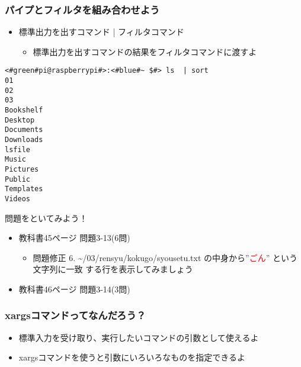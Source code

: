 \begin{frame}[fragile]
    \frametitle{パイプとフィルタを組み合わせよう}
    \begin{itemize}
        \item 標準出力を出すコマンド | フィルタコマンド
        \begin{itemize}
            \small
            \item[] 標準出力を出すコマンドの結果をフィルタコマンドに渡すよ
        \end{itemize}
    \end{itemize}
    \begin{lstlisting}[title=パイプラインを用いたsortコマンドの実行例, label=ppsort_example]
<#green#pi@raspberrypi#>:<#blue#~ $#> ls  | sort
01
02
03
Bookshelf
Desktop
Documents
Downloads
lsfile
Music
Pictures
Public
Templates
Videos
    \end{lstlisting}
\end{frame}

\begin{frame}
    \begin{exampleblock}{問題をといてみよう！}
        \begin{itemize}
            \item 教科書45ページ 問題3-13(6問)
            \begin{itemize}
                \item 問題修正 6. \textasciitilde/03/rensyu/kokugo/syousetu.txt の中身から”\textcolor{red}{ごん}” という文字列に一致
                する行を表示してみましょう
            \end{itemize}
            \item 教科書46ページ 問題3-14(3問)
        \end{itemize}
    \end{exampleblock} 
\end{frame}

\begin{frame}
    \frametitle{xargsコマンドってなんだろう？}
    \begin{itemize}
        \item 標準入力を受け取り、実行したいコマンドの引数として使えるよ
        \item xargsコマンドを使うと引数にいろいろなものを指定できるよ
    \end{itemize}
    \begin{figure}
        \centering
        
    \end{figure}
\end{frame}

